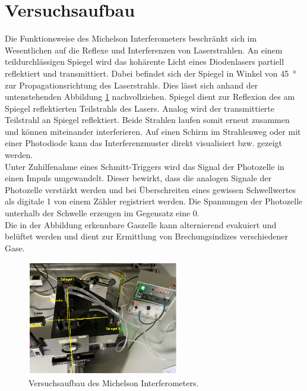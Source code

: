


\section{Versuchsaufbau}

Die Funktionsweise des Michelson Interferometers beschränkt sich  im Wesentlichen auf die Reflexe und Interferenzen 
von Laserstrahlen. An einem teildurchlässigen Spiegel wird das kohärente Licht eines Diodenlasers partiell reflektiert 
und transmittiert. Dabei befindet sich der Spiegel in Winkel von \qty{45}{\degree} zur Propagationsrichtung des Laserstrahls.
Dies lässt sich anhand der untenstehenden Abbildung \ref{fig:Aufbau} nachvollziehen. Spiegel  dient zur Reflexion des 
am Spiegel reflektierten Teilstrahls des Lasers. Analog wird der transmittierte Teilstrahl an Spiegel  reflektiert.
Beide Strahlen laufen somit erneut zusammen und können miteinander interferieren. Auf einen Schirm im Strahlenweg oder mit einer
Photodiode kann das Interferenzmuster direkt visualisiert bzw. gezeigt werden.\\

\noindent Unter Zuhilfenahme eines Schmitt-Triggers wird das Signal der Photozelle in einen Impuls umgewandelt. Dieser bewirkt,
dass die analogen Signale der Photozelle verstärkt werden und bei Überschreiten eines gewissen Schwellwertes als digitale 1 von 
einem Zähler registriert werden. Die Spannungen der Photozelle unterhalb der Schwelle erzeugen im Gegensatz eine 0.\\

\noindent Die in der Abbildung erkennbare Gaszelle kann alternierend evakuiert und belüftet werden und dient zur Ermittlung 
von Brechungsindizes verschiedener Gase.

\begin{figure}[H]
    \centering
    \includegraphics[height=5cm]{Aufbau.png}
    \caption{Versuchsaufbau des Michelson Interferometers\cite{Versuchsanleitung_v401}.}
    \label{fig:Aufbau}
\end{figure}


